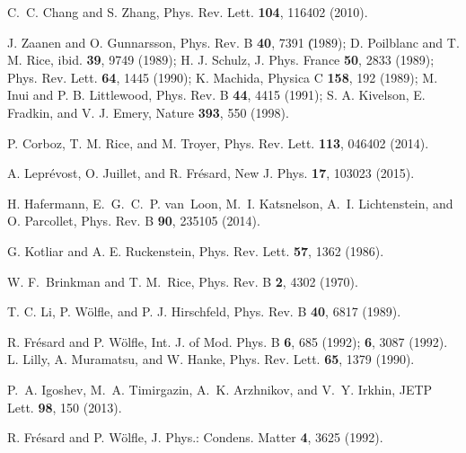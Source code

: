 \documentclass[showpacs,amsmath,twocolumn,floatfix]{revtex4-1}
\begin{document}
\begin{thebibliography}{0}
 C.~C. Chang and S. Zhang, 
                    Phys. Rev. Lett. \textbf{104}, 116402 (2010).
                   

 J. Zaanen and O. Gunnarsson, 
                      Phys. Rev. B \textbf{40}, 7391 (͑1989); 
                  D. Poilblanc and T. M. Rice, 
                      ibid. \textbf{39}, 9749 (1989); 
                  H. J. Schulz, 
                      J. Phys. France \textbf{50}, 2833 (1989); 
                      Phys. Rev. Lett. \textbf{64}, 1445 (1990);
                  K. Machida, 
                      Physica C \textbf{158}, 192 (1989); 
                  M. Inui and P. B. Littlewood,
                      Phys. Rev. B \textbf{44}, 4415 (1991);
                  S. A. Kivelson, E. Fradkin, and V. J. Emery, 
                      Nature \textbf{393}, 550  (1998).    
                      
  P. Corboz, T. M. Rice, and M. Troyer,
                      Phys. Rev. Lett. \textbf{113}, 046402 (2014).
                    
 A. Lepr\'evost, O. Juillet, and R. Fr\'esard,
                    New J. Phys. \textbf{17}, 103023 (2015).
                 
 H. Hafermann, E.~G.~C.~P. van~Loon, M.~I. Katsnelson, 
                A.~I. Lichtenstein, and O. Parcollet,
                    Phys. Rev. B \textbf{90}, 235105 (2014).

 G. Kotliar and A. E. Ruckenstein,
                    Phys. Rev. Lett. \textbf{57}, 1362 (1986).

 W. F.~Brinkman and T. M.~Rice,
                    Phys. Rev. B \textbf{2}, 4302 (1970).

  T. C. Li, P. W\"olfle, and P. J. Hirschfeld,
                    Phys. Rev. B \textbf{40}, 6817 (1989).

    R. Fr\'esard and P. W\"olfle,
                    Int. J. of Mod. Phys. B \textbf{6},  685 (1992);
                                            \textbf{6}, 3087 (1992).
 L. Lilly, A. Muramatsu, and W. Hanke,
                    Phys. Rev. Lett. \textbf{65}, 1379 (1990).

 P.~A. Igoshev, M.~A. Timirgazin, A.~K. Arzhnikov, and V.~Y. Irkhin, 
                    JETP Lett. \textbf{98}, 150 (2013).

 R. Fr\'esard and P. W\"olfle,
                    J. Phys.: Condens. Matter \textbf{4}, 3625 (1992).
                    

\end{thebibliography}
\end{document}
